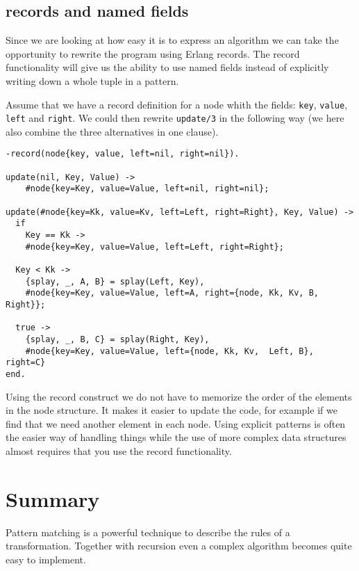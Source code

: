 \documentclass[a4paper,11pt]{article}
\begin{document}
\subsection{records and named fields}

Since we are looking at how easy it is to express an algorithm we can
take the opportunity to rewrite the program using Erlang records. The
record functionality will give us the ability to use named fields
instead of explicitly writing down a whole tuple in a pattern.

Assume that we have a record definition for a node whith the fields:
{\tt key}, {\tt value}, {\tt left} and {\tt right}. We could then
rewrite {\tt update/3} in the following way (we here also combine the
three alternatives in one clause).

\lstset{language=erlang}

\begin{lstlisting}
-record(node{key, value, left=nil, right=nil}). 

update(nil, Key, Value) ->
    #node{key=Key, value=Value, left=nil, right=nil};

update(#node{key=Kk, value=Kv, left=Left, right=Right}, Key, Value) -> 
  if
    Key == Kk ->
    #node{key=Key, value=Value, left=Left, right=Right};
             
  Key < Kk ->
    {splay, _, A, B} = splay(Left, Key),
    #node{key=Key, value=Value, left=A, right={node, Kk, Kv, B, Right}};

  true ->
    {splay, _, B, C} = splay(Right, Key),
    #node{key=Key, value=Value, left={node, Kk, Kv,  Left, B}, right=C}
end.
\end{lstlisting}

Using the record construct we do not have to memorize the order of the
elements in the node structure. It makes it easier to update the code,
for example if we find that we need another element in each
node. Using explicit patterns is often the easier way of handling
things while the use of more complex data structures almost requires
that you use the record functionality.

\section{Summary}

Pattern matching is a powerful technique to describe the rules of a
transformation. Together with recursion even a complex algorithm
becomes quite easy to implement. 
\end{document}
